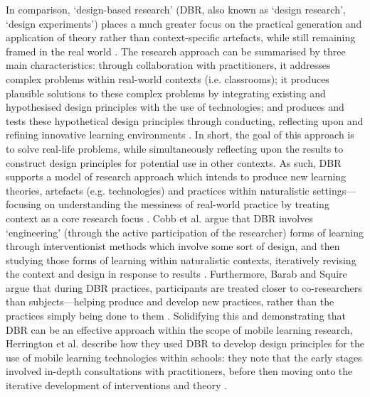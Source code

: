 In comparison, `design-based research' (DBR, also known as `design research', `design experiments') places a much greater focus on the practical generation and application of theory rather than context-specific artefacts, while still remaining framed in the real world \citep{zimmerman2007}. The research approach can be summarised by three main characteristics: through collaboration with practitioners, it addresses complex problems within real-world contexts (i.e. classrooms); it produces plausible solutions to these complex problems by integrating existing and hypothesised design principles with the use of technologies; and produces and tests these hypothetical design principles through conducting, reflecting upon and refining innovative learning environments \citep{reeves2000, brown1992, collins1992}. In short, the goal of this approach is to solve real-life problems, while simultaneously reflecting upon the results to construct design principles for potential use in other contexts. As such, DBR supports a model of research approach which intends to produce new learning theories, artefacts (e.g. technologies) and practices within naturalistic settings---focusing on understanding the messiness of real-world practice by treating context as a core research focus \citep{Barab2004}. Cobb et al. argue that DBR involves `engineering' (through the active participation of the researcher) forms of learning through interventionist methods which involve some sort of design, and then studying those forms of learning within naturalistic contexts, iteratively revising the context and design in response to results \citep{cobb2003}. Furthermore, Barab and Squire argue that during DBR practices, participants are treated closer to co-researchers than subjects---helping produce and develop new practices, rather than the practices simply being done to them \citep{Barab2004}. Solidifying this and demonstrating that DBR can be an effective approach within the scope of mobile learning research, Herrington et al. describe how they used DBR to develop design principles for the use of mobile learning technologies within schools: they note that the early stages involved in-depth consultations with practitioners, before then moving onto the iterative development of interventions and theory \citep{herrington2009}.

